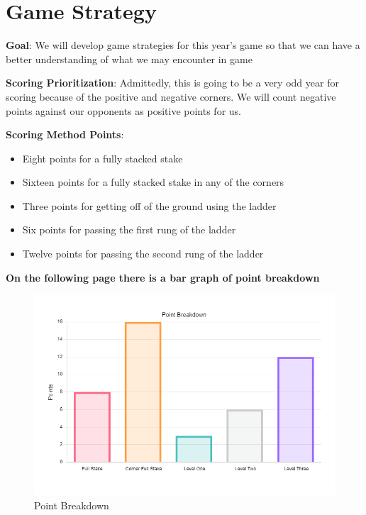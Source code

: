     \section*{Game Strategy}
    \textbf{Goal}:
    We will develop game strategies for this year's game so that we can have a better understanding of what we may encounter in game

    \textbf{Scoring Prioritization}:
    Admittedly, this is going to be a very odd year for scoring because of the positive and negative corners. We will count negative points against our opponents as positive points for us.

    \textbf{Scoring Method Points}:
    \begin{itemize}
        \item Eight points for a fully stacked stake
        \item Sixteen points for a fully stacked stake in any of the corners 
        \item Three points for getting off of the ground using the ladder 
        \item Six points for passing the first rung of the ladder
        \item Twelve points for passing the second rung of the ladder 
    \end{itemize}
    \centering \textbf{On the following page there is a bar graph of point breakdown}
    \pagebreak
    \begin{figure}[t!]
        \centering
        \includegraphics[width=1\textwidth]{images/Point Breakdown .jpg}
        \caption{Point Breakdown}
        \label{fig:point-breakdown}
    \end{figure}
    
